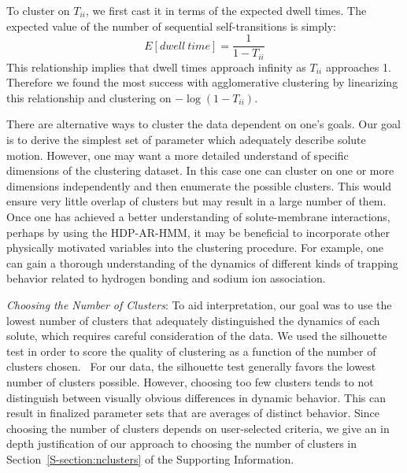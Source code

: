 \documentclass[journal=jpcbfk,manuscript=article]{achemso}
\begin{document}
  To cluster on $T_{ii}$, we first cast it in terms of the expected dwell times. The expected
  value of the number of sequential self-transitions is simply:
  \begin{equation}  
   E[dwell~time] = \frac{1}{1 - T_{ii}}
   \label{eqn:dwell_times}
  \end{equation}  
  This relationship implies that dwell times approach infinity as $T_{ii}$ approaches
  1. Therefore we found the most success with agglomerative clustering by linearizing this
  relationship and clustering on $-\log(1 - T_{ii})$.
  
  There are alternative ways to cluster the data dependent on one's goals. Our goal is
  to derive the simplest set of parameter which adequately describe solute motion. 
  However, one may want a more detailed understand of specific dimensions of the 
  clustering dataset. In this case one can cluster on one or more dimensions independently
  and then enumerate the possible clusters. This would ensure very little overlap of
  clusters but may result in a large number of them. Once one has achieved a better 
  understanding of solute-membrane interactions, perhaps by using the HDP-AR-HMM, it may be
  beneficial to incorporate other physically motivated variables into the clustering
  procedure. For example, one can gain a thorough understanding of the dynamics of
  different kinds of trapping behavior related to hydrogen bonding and sodium ion association.
 

  \textit{Choosing the Number of Clusters}: To aid interpretation, our goal was to
  use the lowest number of clusters that adequately distinguished the dynamics of 
  each solute, which requires careful consideration of the data. We used the silhouette
  test in order to score the quality of clustering as a function of the number of clusters
  chosen.~\cite{kaufman_finding_2009} For our data, the silhouette test generally favors 
  the lowest number of clusters possible. However, choosing too few clusters tends to not
  distinguish between visually obvious differences in dynamic behavior. This can result 
  in finalized parameter sets that are averages of distinct behavior. Since choosing 
  the number of clusters depends on user-selected criteria, we give an in depth 
  justification of our approach to choosing the number of clusters in 
  Section~\ref{S-section:nclusters} of the Supporting Information.  
  
\end{document}

